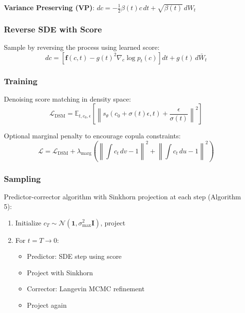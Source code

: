 \documentclass[11pt]{article}
\begin{document}
\textbf{Variance Preserving (VP)}:  $dc = -\frac{1}{2} \beta(t) c \, dt + \sqrt{\beta(t)} \, dW_t$

\subsubsection{Reverse SDE with Score}

Sample by reversing the process using learned score:
\begin{equation}
dc = \left[ \mathbf{f}(c, t) - g(t)^2 \nabla_c \log p_t(c) \right] dt + g(t) \, d\bar{W}_t
\end{equation}

\subsubsection{Training}

Denoising score matching in density space:
\begin{equation}
\mathcal{L}_{\text{DSM}} = \mathbb{E}_{t, c_0, \epsilon} \left[ \left\| s_\theta(c_0 + \sigma(t) \epsilon, t) + \frac{\epsilon}{\sigma(t)} \right\|^2 \right]
\end{equation}

Optional marginal penalty to encourage copula constraints:
\begin{equation}
\mathcal{L} = \mathcal{L}_{\text{DSM}} + \lambda_{\text{marg}} \left( \left\| \int c_t \, dv - 1 \right\|^2 + \left\| \int c_t \, du - 1 \right\|^2 \right)
\end{equation}

\subsubsection{Sampling}

Predictor-corrector algorithm with Sinkhorn projection at each step (Algorithm 5):
\begin{enumerate}
    \item Initialize $c_T \sim \mathcal{N}(\mathbf{1}, \sigma^2_{\max} \mathbf{I})$, project
    \item For $t = T \to 0$:
    \begin{itemize}
        \item Predictor: SDE step using score
        \item Project with Sinkhorn
        \item Corrector: Langevin MCMC refinement
        \item Project again
    \end{itemize}
\end{enumerate}
\end{document}
